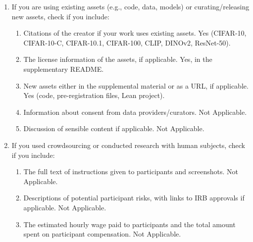 \begin{enumerate}
\begin{enumerate}
    \cref{app:deviations}.
    \item A clear definition of the specific measure or statistics and error bars. Yes: bootstrap
    intervals over seeds, or over seeds and shift families (\cref{sec:experiments}).
    \item A description of the computing infrastructure used. Yes (\cref{app:details}).
  \end{enumerate}
  \item If you are using existing assets (e.g., code, data, models) or curating/releasing new assets,
  check if you include:
  \begin{enumerate}
    \item Citations of the creator if your work uses existing assets. Yes (CIFAR-10, CIFAR-10-C, CIFAR-10.1,
    CIFAR-100, CLIP, DINOv2, ResNet-50).
    \item The license information of the assets, if applicable. Yes, in the supplementary README.
    \item New assets either in the supplemental material or as a URL, if applicable. Yes (code,
    pre-registration files, Lean project).
    \item Information about consent from data providers/curators. Not Applicable.
    \item Discussion of sensible content if applicable. Not Applicable.
  \end{enumerate}
  \item If you used crowdsourcing or conducted research with human subjects, check if you include:
  \begin{enumerate}
    \item The full text of instructions given to participants and screenshots. Not Applicable.
    \item Descriptions of potential participant risks, with links to IRB approvals if applicable. Not
    Applicable.
    \item The estimated hourly wage paid to participants and the total amount spent on participant
    compensation. Not Applicable.
  \end{enumerate}
\end{enumerate}
